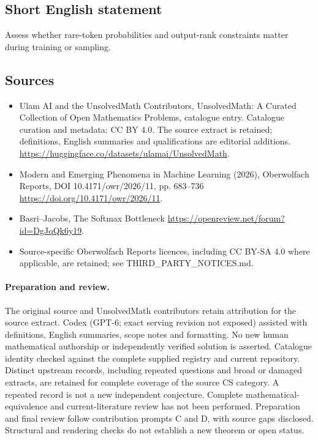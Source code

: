\documentclass[11pt]{article}
\begin{document}
\subsection{Short English statement}
Assess whether rare-token probabilities and output-rank constraints matter during training or sampling.
\subsection{Sources}
\begin{itemize}
\item[\hypertarget{source:statement:1}{S1}] Ulam AI and the UnsolvedMath Contributors, UnsolvedMath: A Curated Collection of Open Mathematics Problems, catalogue entry. Catalogue curation and metadata: CC BY 4.0. The source extract is retained; definitions, English summaries and qualifications are editorial additions.
\url{https://huggingface.co/datasets/ulamai/UnsolvedMath}.
\item[\hypertarget{source:statement:2}{S2}] Modern and Emerging Phenomena in Machine Learning (2026), Oberwolfach Reports, DOI 10.4171/owr/2026/11, pp. 683--736
\url{https://doi.org/10.4171/owr/2026/11}.
\item[\hypertarget{source:statement:3}{S3}] Basri--Jacobs, The Softmax Bottleneck
\url{https://openreview.net/forum?id=DgJqQk6y19}.
\item Source-specific Oberwolfach Reports licences, including CC BY-SA 4.0 where applicable, are retained; see THIRD\_PARTY\_NOTICES.md.
\end{itemize}
\paragraph{Preparation and review.}
The original source and UnsolvedMath contributors retain attribution for the source extract. Codex (GPT-6; exact serving revision not exposed) assisted with definitions, English summaries, scope notes and formatting. No new human mathematical authorship or independently verified solution is asserted. Catalogue identity checked against the complete supplied registry and current repository. Distinct upstream records, including repeated questions and broad or damaged extracts, are retained for complete coverage of the source CS category. A repeated record is not a new independent conjecture. Complete mathematical-equivalence and current-literature review has not been performed. Preparation and final review follow contribution prompts C and D, with source gaps disclosed. Structural and rendering checks do not establish a new theorem or open status.
\label{end:statement}
\end{document}
